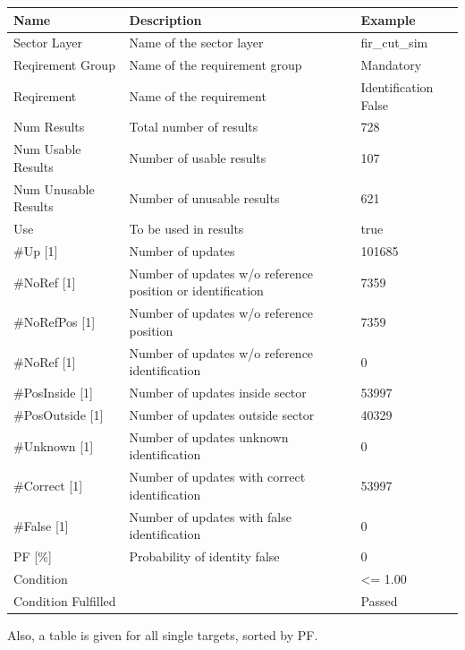 \begin{center}
 \begin{table}[H]
  \begin{tabularx}{\textwidth}{ | l | X |  l | }
    \hline
    \textbf{Name} & \textbf{Description} & \textbf{Example} \\ \hline
    Sector Layer & Name of the sector layer & fir\_cut\_sim \\ \hline
    Reqirement Group & Name of the requirement group & Mandatory \\ \hline
    Reqirement & Name of the requirement & Identification False \\ \hline
    Num Results & Total number of results & 728 \\ \hline
    Num Usable Results & Number of usable results & 107 \\ \hline
    Num Unusable Results & Number of unusable results & 621 \\ \hline
    Use & To be used in results & true \\ \hline
    \#Up [1] & Number of updates & 101685 \\ \hline
    \#NoRef [1] & Number of updates w/o reference position or identification & 7359 \\ \hline
    \#NoRefPos [1] & Number of updates w/o reference position  & 7359 \\ \hline
    \#NoRef [1] & Number of updates w/o reference identification & 0 \\ \hline
    \#PosInside [1] & Number of updates inside sector & 53997 \\ \hline
    \#PosOutside [1] & Number of updates outside sector & 40329 \\ \hline
    \#Unknown [1] & Number of updates unknown identification & 0 \\ \hline
    \#Correct [1] & Number of updates with correct identification & 53997 \\ \hline
    \#False [1] & Number of updates with false identification & 0 \\ \hline
    PF [\%] & Probability of identity false & 0 \\ \hline
    Condition &  & <= 1.00 \\ \hline
    Condition Fulfilled &  & Passed \\ \hline
\end{tabularx}
\end{table}
\end{center}

Also, a table is given for all single targets, sorted by PF.

